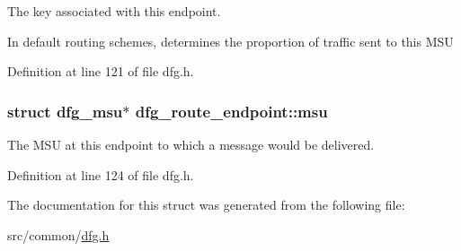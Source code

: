 The key associated with this endpoint. 

In default routing schemes, determines the proportion of traffic sent to this M\-S\-U 

Definition at line 121 of file dfg.\-h.

\hypertarget{structdfg__route__endpoint_aa05dabbb8629dbf8d032ef0d4f304e4d}{
\subsubsection[{msu}]{\setlength{\rightskip}{0pt plus 5cm}struct {\bf dfg\-\_\-msu}$\ast$ dfg\-\_\-route\-\_\-endpoint\-::msu}}\label{structdfg__route__endpoint_aa05dabbb8629dbf8d032ef0d4f304e4d}


The M\-S\-U at this endpoint to which a message would be delivered. 



Definition at line 124 of file dfg.\-h.



The documentation for this struct was generated from the following file\-:\begin{DoxyCompactItemize}
\item 
src/common/\hyperlink{dfg_8h}{dfg.\-h}\end{DoxyCompactItemize}
